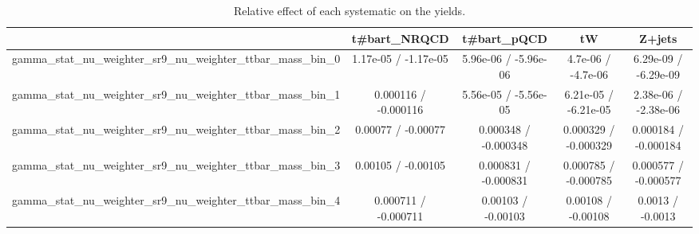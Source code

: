 \documentclass[10pt]{article}
\begin{document}
\begin{table}[htbp]
\begin{center}
\begin{tabular}{|c|c|c|c|c|}
\hline 
      & t#bar{t}_{NRQCD}      & t#bar{t}_{pQCD}      & tW      & Z+jets \\ 
\hline 
  gamma_stat_nu_weighter_sr9_nu_weighter_ttbar_mass_bin_0 & 1.17e-05 / -1.17e-05 & 5.96e-06 / -5.96e-06 & 4.7e-06 / -4.7e-06 & 6.29e-09 / -6.29e-09 \\ 
  gamma_stat_nu_weighter_sr9_nu_weighter_ttbar_mass_bin_1 & 0.000116 / -0.000116 & 5.56e-05 / -5.56e-05 & 6.21e-05 / -6.21e-05 & 2.38e-06 / -2.38e-06 \\ 
  gamma_stat_nu_weighter_sr9_nu_weighter_ttbar_mass_bin_2 & 0.00077 / -0.00077 & 0.000348 / -0.000348 & 0.000329 / -0.000329 & 0.000184 / -0.000184 \\ 
  gamma_stat_nu_weighter_sr9_nu_weighter_ttbar_mass_bin_3 & 0.00105 / -0.00105 & 0.000831 / -0.000831 & 0.000785 / -0.000785 & 0.000577 / -0.000577 \\ 
  gamma_stat_nu_weighter_sr9_nu_weighter_ttbar_mass_bin_4 & 0.000711 / -0.000711 & 0.00103 / -0.00103 & 0.00108 / -0.00108 & 0.0013 / -0.0013 \\ 
\hline 
\end{tabular} 
\caption{Relative effect of each systematic on the yields.} 
\end{center} 
\end{table} 
\end{document}

